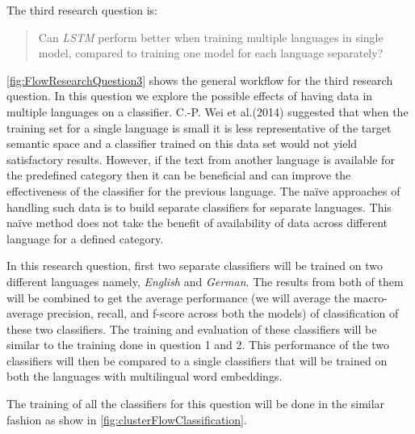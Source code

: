 The third research question is:

\begin{quote}
    Can \textit{LSTM} perform better when training multiple languages in single model, compared to training one model for each language separately?
\end{quote}

\ref{fig:FlowResearchQuestion3} shows the general workflow for the third research question. In this question we explore the possible effects of having data in multiple languages on a classifier. C.-P. Wei et al.(2014)\cite{Wei:2014:EPD:2566999.2567111} suggested that when the training set for a single language is small it is less representative of the target semantic space and a classifier trained on this data set would not yield satisfactory results. However, if the text from another language is available for the predefined category then it can be beneficial and can improve the effectiveness of the classifier for the previous language. The naïve approaches of handling such data is to build separate classifiers for separate languages. This naïve method does not take the benefit of availability of data across different language for a defined category. 

In this research question, first two separate classifiers will be trained on two different languages namely, \textit{English} and \textit{German}. The results from both of them will be combined to get the average performance (we will average the macro-average precision, recall, and f-score across both the models) of classification of these two classifiers. The training and evaluation of these classifiers will be similar to the training done in question 1 and 2. This performance of the two classifiers will then be compared to a single classifiers that will be trained on both the languages with multilingual word embeddings.

The training of all the classifiers for this question will be done in the similar fashion as show in \ref{fig:clusterFlowClassification}.


